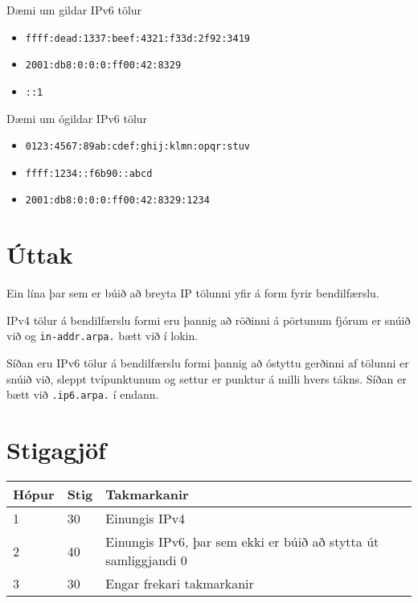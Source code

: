 Dæmi um gildar IPv6 tölur
\begin{itemize}
	\item \texttt{ffff:dead:1337:beef:4321:f33d:2f92:3419}
	\item \texttt{2001:db8:0:0:0:ff00:42:8329}
	\item \texttt{::1}
\end{itemize}

Dæmi um ógildar IPv6 tölur
\begin{itemize}
	\item \texttt{0123:4567:89ab:cdef:ghij:klmn:opqr:stuv}
	\item \texttt{ffff:1234::f6b90::abcd}
	\item \texttt{2001:db8:0:0:0:ff00:42:8329:1234}
\end{itemize}

\section*{Úttak}
Ein lína þar sem er búið að breyta IP tölunni yfir á form fyrir bendilfærslu.

IPv4 tölur á bendilfærslu formi eru þannig að röðinni á pörtunum fjórum er snúið við og \texttt{in-addr.arpa.} bætt við í lokin.

Síðan eru IPv6 tölur á bendilfærslu formi þannig að óstyttu gerðinni af 
tölunni er snúið við, sleppt tvípunktunum og settur er punktur á milli hvers tákns. 
Síðan er bætt við \texttt{.ip6.arpa.} í endann.

\section*{Stigagjöf}
\begin{tabular}{|l|l|l|}
\hline
Hópur & Stig & Takmarkanir \\ \hline
1     & 30   & Einungis IPv4 \\ \hline
2     & 40   & Einungis IPv6, þar sem ekki er búið að stytta út samliggjandi 0 \\ \hline
3     & 30   & Engar frekari takmarkanir \\ \hline
\end{tabular}

